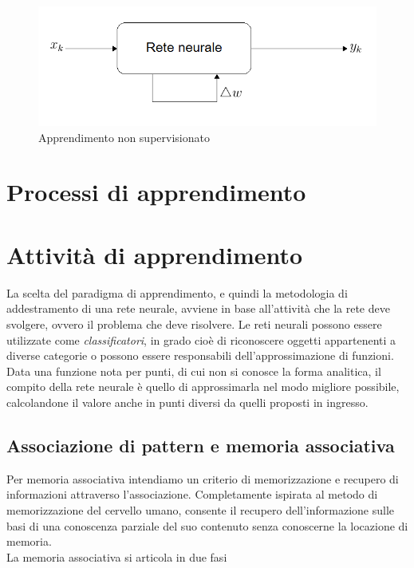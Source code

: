 \documentclass[12pt,a4paper,oneside]{book}
\begin{document}
		\begin{figure}[h]
			\centering
			\includegraphics[width=0.7\linewidth]{IMMAGINI/nonsupervisionato}
			\caption{ Apprendimento non supervisionato}
			\label{fig:nonsupervisionato}
		\end{figure}
		
		
	\section {Processi di apprendimento}
		
	\section{Attività di apprendimento}
		
		La scelta del paradigma di apprendimento, e quindi la metodologia di addestramento di una rete neurale, avviene in base all'attività che la rete deve svolgere, ovvero il problema che deve risolvere. Le reti neurali possono essere utilizzate come \emph{classificatori}, in grado cioè di riconoscere oggetti appartenenti a diverse categorie o possono essere responsabili dell'approssimazione di funzioni. Data una funzione nota per punti, di cui non si conosce la forma analitica, il compito della rete neurale è quello di approssimarla nel modo migliore possibile, calcolandone il valore anche in punti diversi da quelli proposti in ingresso.\\
		
		\subsection{Associazione di pattern e memoria associativa}
		
		Per memoria associativa intendiamo un criterio di memorizzazione e recupero di informazioni attraverso l'associazione. Completamente ispirata al metodo di memorizzazione del cervello umano, consente il recupero dell'informazione sulle basi di una conoscenza parziale del suo contenuto senza conoscerne la locazione di memoria.\\
		La memoria associativa si articola in due fasi\\
		
\end{document}
